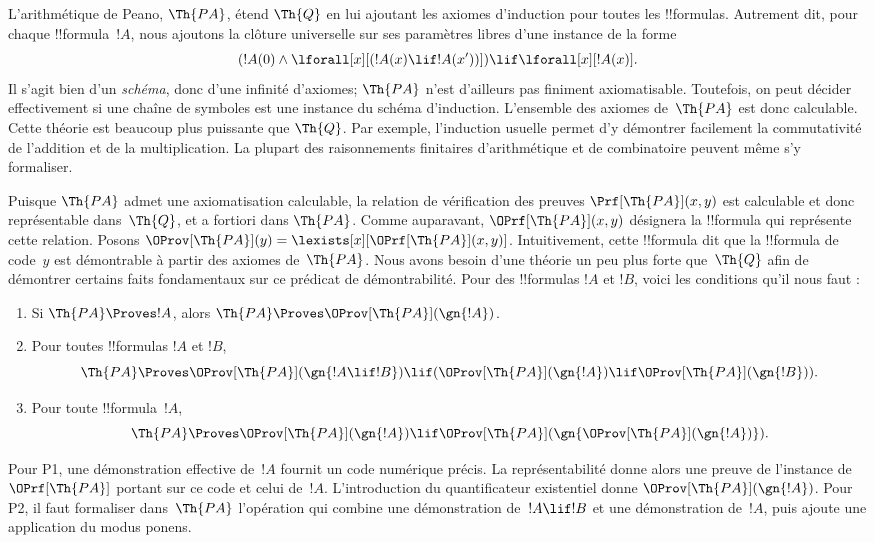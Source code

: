 \documentclass[../../../include/open-logic-section]{subfiles}
\begin{document}


L'arithmétique de Peano, $\Th{PA}$, étend
$\Th{Q}$ en lui ajoutant les axiomes d'induction
pour toutes les !!{formula}s. Autrement dit, pour
chaque !!{formula}~$!A$, nous ajoutons la clôture universelle sur ses paramètres libres
d'une instance de la forme
\[
(!A(0)\land\lforall[x][(!A(x)\lif !A(x'))])
\lif\lforall[x][!A(x)].
\]
Il s'agit bien d'un \emph{schéma}, donc d'une
infinité d'axiomes; $\Th{PA}$ n'est d'ailleurs
pas finiment axiomatisable. Toutefois, on peut
décider effectivement si une chaîne de symboles
est une instance du schéma d'induction. L'ensemble
des axiomes de~$\Th{PA}$ est donc calculable.
Cette théorie est beaucoup plus puissante que
$\Th{Q}$. Par exemple, l'induction usuelle
permet d'y démontrer facilement la commutativité
de l'addition et de la multiplication. La plupart
des raisonnements finitaires d'arithmétique et de
combinatoire peuvent même s'y formaliser.

Puisque $\Th{PA}$ admet une axiomatisation
calculable, la relation de vérification des preuves
$\Prf[\Th{PA}](x,y)$ est calculable et donc
représentable dans~$\Th{Q}$, et a fortiori dans
$\Th{PA}$. Comme auparavant,
$\OPrf[\Th{PA}](x,y)$ désignera la !!{formula}
qui représente cette relation. Posons
$\OProv[\Th{PA}](y)=
\lexists[x][\OPrf[\Th{PA}](x,y)]$.
Intuitivement, cette !!{formula} dit que la !!{formula} de code~$y$ est démontrable à partir
des axiomes de~$\Th{PA}$. Nous avons besoin d'une
théorie un peu plus forte que~$\Th{Q}$ afin de
démontrer certains faits fondamentaux sur ce
prédicat de démontrabilité. Pour des !!{formula}s $!A$ et $!B$, voici
les conditions qu'il nous faut :
\begin{enumerate}
\item[P1.] Si $\Th{PA}\Proves !A$, alors
  $\Th{PA}\Proves\OProv[\Th{PA}](\gn{!A})$.
\item[P2.] Pour toutes !!{formula}s $!A$ et $!B$,
  \[
  \Th{PA}\Proves\OProv[\Th{PA}](\gn{!A\lif !B})
  \lif(\OProv[\Th{PA}](\gn{!A})
  \lif\OProv[\Th{PA}](\gn{!B})).
  \]
\item[P3.] Pour toute !!{formula}~$!A$,
  \[
  \Th{PA}\Proves\OProv[\Th{PA}](\gn{!A})
  \lif\OProv[\Th{PA}]
  (\gn{\OProv[\Th{PA}](\gn{!A})}).
  \]
\end{enumerate}
Pour P1, une démonstration effective de~$!A$ fournit un code
numérique précis. La représentabilité donne alors une preuve
de l'instance de~$\OPrf[\Th{PA}]$ portant sur ce code et celui
de~$!A$. L'introduction du quantificateur existentiel donne
$\OProv[\Th{PA}](\gn{!A})$. Pour P2, il faut formaliser
dans~$\Th{PA}$ l'opération qui combine une démonstration
de~$!A\lif !B$ et une démonstration de~$!A$, puis ajoute
une application du modus ponens.
\end{document}
